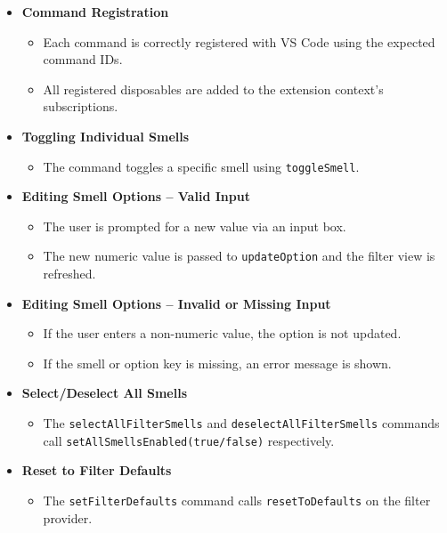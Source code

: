 \documentclass[12pt, titlepage]{article}
\begin{document}
\begin{itemize}
  \item \textbf{Command Registration}
    \begin{itemize}
      \item Each command is correctly registered with VS Code using the expected command IDs.
      \item All registered disposables are added to the extension context’s subscriptions.
    \end{itemize}

  \item \textbf{Toggling Individual Smells}
    \begin{itemize}
      \item The command toggles a specific smell using \texttt{toggleSmell}.
    \end{itemize}

  \item \textbf{Editing Smell Options – Valid Input}
    \begin{itemize}
      \item The user is prompted for a new value via an input box.
      \item The new numeric value is passed to \texttt{updateOption} and the filter view is refreshed.
    \end{itemize}

  \item \textbf{Editing Smell Options – Invalid or Missing Input}
    \begin{itemize}
      \item If the user enters a non-numeric value, the option is not updated.
      \item If the smell or option key is missing, an error message is shown.
    \end{itemize}

  \item \textbf{Select/Deselect All Smells}
    \begin{itemize}
      \item The \texttt{selectAllFilterSmells} and \texttt{deselectAllFilterSmells} commands call \texttt{setAllSmellsEnabled(true/false)} respectively.
    \end{itemize}

  \item \textbf{Reset to Filter Defaults}
    \begin{itemize}
      \item The \texttt{setFilterDefaults} command calls \texttt{resetToDefaults} on the filter provider.
    \end{itemize}
\end{itemize}
\end{document}
